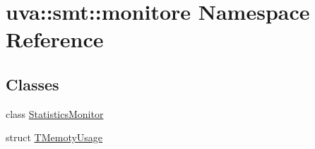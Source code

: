 \hypertarget{namespaceuva_1_1smt_1_1monitore}{}\section{uva\+:\+:smt\+:\+:monitore Namespace Reference}
\label{namespaceuva_1_1smt_1_1monitore}
\subsection*{Classes}
\begin{DoxyCompactItemize}
\item 
class \hyperlink{classuva_1_1smt_1_1monitore_1_1_statistics_monitor}{Statistics\+Monitor}
\item 
struct \hyperlink{structuva_1_1smt_1_1monitore_1_1_t_memoty_usage}{T\+Memoty\+Usage}
\end{DoxyCompactItemize}
